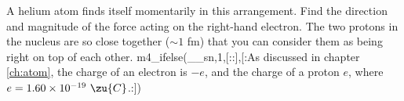         A helium atom finds itself momentarily in this
        arrangement.  Find the direction and magnitude of the force
        acting on the right-hand electron.  The two protons in the
        nucleus are so close together ($\sim1$ fm) that you can
        consider them as being right on top of each other.
m4_ifelse(__sn,1,[::],[:As discussed in chapter \ref{ch:atom}, the
charge of an electron is $-e$, and the charge of a proton $e$,
where $e=1.60\times10^{-19}\ \zu{C}$.:])
\answercheck
